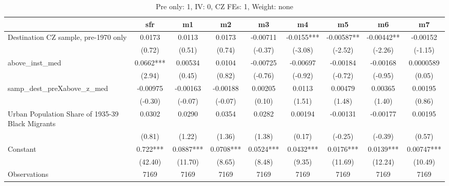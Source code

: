 \begin{table}[htbp]\centering
\def\sym#1{\ifmmode^{#1}\else\(^{#1}\)\fi}
\caption{Pre only: 1, IV: 0, CZ FEs: 1, Weight: none}
\begin{tabular}{l*{8}{c}}
\toprule
                    &\multicolumn{1}{c}{sfr}&\multicolumn{1}{c}{m1}&\multicolumn{1}{c}{m2}&\multicolumn{1}{c}{m3}&\multicolumn{1}{c}{m4}&\multicolumn{1}{c}{m5}&\multicolumn{1}{c}{m6}&\multicolumn{1}{c}{m7}\\
\midrule
Destination CZ sample, pre-1970 only&      0.0173   &      0.0113   &      0.0173   &    -0.00711   &     -0.0155***&    -0.00587** &    -0.00442** &    -0.00152   \\
                    &      (0.72)   &      (0.51)   &      (0.74)   &     (-0.37)   &     (-3.08)   &     (-2.52)   &     (-2.26)   &     (-1.15)   \\
\addlinespace
above\_inst\_med      &      0.0662***&     0.00534   &      0.0104   &    -0.00725   &    -0.00697   &    -0.00184   &    -0.00168   &   0.0000589   \\
                    &      (2.94)   &      (0.45)   &      (0.82)   &     (-0.76)   &     (-0.92)   &     (-0.72)   &     (-0.95)   &      (0.05)   \\
\addlinespace
samp\_dest\_preXabove\_z\_med&    -0.00975   &    -0.00163   &    -0.00188   &     0.00205   &      0.0113   &     0.00479   &     0.00365   &     0.00195   \\
                    &     (-0.30)   &     (-0.07)   &     (-0.07)   &      (0.10)   &      (1.51)   &      (1.48)   &      (1.40)   &      (0.86)   \\
\addlinespace
Urban Population Share of 1935-39 Black Migrants&      0.0302   &      0.0290   &      0.0354   &      0.0282   &     0.00194   &    -0.00131   &    -0.00177   &     0.00195   \\
                    &      (0.81)   &      (1.22)   &      (1.36)   &      (1.38)   &      (0.17)   &     (-0.25)   &     (-0.39)   &      (0.57)   \\
\addlinespace
Constant            &       0.722***&      0.0887***&      0.0708***&      0.0524***&      0.0432***&      0.0176***&      0.0139***&     0.00747***\\
                    &     (42.40)   &     (11.70)   &      (8.65)   &      (8.48)   &      (9.35)   &     (11.69)   &     (12.24)   &     (10.49)   \\
\midrule
Observations        &        7169   &        7169   &        7169   &        7169   &        7169   &        7169   &        7169   &        7169   \\

\end{tabular}
\end{table}
